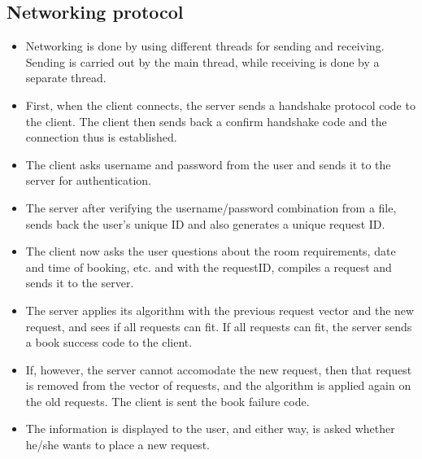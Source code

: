 \documentclass[11pt,a4paper,oneside]{report}
\begin{document}
\subsection{Networking protocol}
\begin{itemize}
\item{Networking is done by using different threads for sending and receiving. Sending is carried out by the main thread, while receiving is done by a separate thread.}
\item{First, when the client connects, the server sends a handshake protocol code to the client. The client then sends back a confirm handshake code and the connection thus is established.}
\item{The client asks username and password from the user and sends it to the server for authentication.}
\item{The server after verifying the username/password combination from a file, sends back the user's unique ID and also generates a unique request ID.}
\item{The client now asks the user questions about the room requirements, date and time of booking, etc. and with the requestID, compiles a request and sends it to the server.}
\item{The server applies its algorithm with the previous request vector and the new request, and sees if all requests can fit. If all requests can fit, the server sends a book success code to the client.}
\item{If, however, the server cannot accomodate the new request, then that request is removed from the vector of requests, and the algorithm is applied again on the old requests. The client is sent the book failure code.}
\item{The information is displayed to the user, and either way, is asked whether he/she wants to place a new request.}

\end{itemize}
\end{document}
